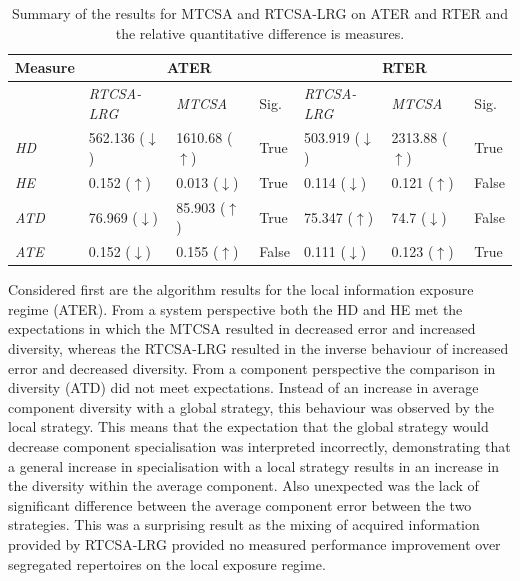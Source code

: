 \begin{table}[ht]
	\centering\small
		\begin{tabular}{lllllll}
		\toprule
		\textbf{Measure} & \multicolumn{3}{c}{\textbf{ATER}} & \multicolumn{3}{c}{\textbf{RTER}} \\ 
		\midrule
		 				 & \emph{RTCSA-LRG} & \emph{MTCSA} & Sig. & \emph{RTCSA-LRG} & \emph{MTCSA} & Sig. \\ 
		\toprule
		\emph{HD}  & 562.136 ($\downarrow$) & 1610.68 ($\uparrow$) & True & 503.919 ($\downarrow$) & 2313.88 ($\uparrow$) & True\\ 
		\emph{HE}  & 0.152 ($\uparrow$) & 0.013 ($\downarrow$) & True &  0.114 ($\downarrow$) & 0.121 ($\uparrow$) & False \\ 
		\emph{ATD} & 76.969 ($\downarrow$)  & 85.903 ($\uparrow$) & True & 75.347 ($\uparrow$) & 74.7 ($\downarrow$) & False \\ 
		\emph{ATE} & 0.152 ($\downarrow$) & 0.155 ($\uparrow$) & False & 0.111 ($\downarrow$) & 0.123 ($\uparrow$) & True \\  
		\bottomrule
		\end{tabular}
	\caption{Summary of the results for MTCSA and RTCSA-LRG on ATER and RTER and the relative quantitative difference is measures.}
	\label{tab:tissue:rtcsa:trends}
\end{table}

Considered first are the algorithm results for the local information exposure regime (ATER). 
From a system perspective both the HD and HE met the expectations in which the MTCSA resulted in decreased error and increased diversity, whereas the RTCSA-LRG resulted in the inverse behaviour of increased error and decreased diversity.
From a component perspective the comparison in diversity (ATD) did not meet expectations. Instead of an increase in average component diversity with a global strategy, this behaviour was observed by the local strategy. This means that the expectation that the global strategy would decrease component specialisation was interpreted incorrectly, demonstrating that a general increase in specialisation with a local strategy results in an increase in the diversity within the average component. Also unexpected was the lack of significant difference between the average component error between the two strategies. This was a surprising result as the mixing of acquired information provided by RTCSA-LRG provided no measured performance improvement over segregated repertoires on the local exposure regime.

